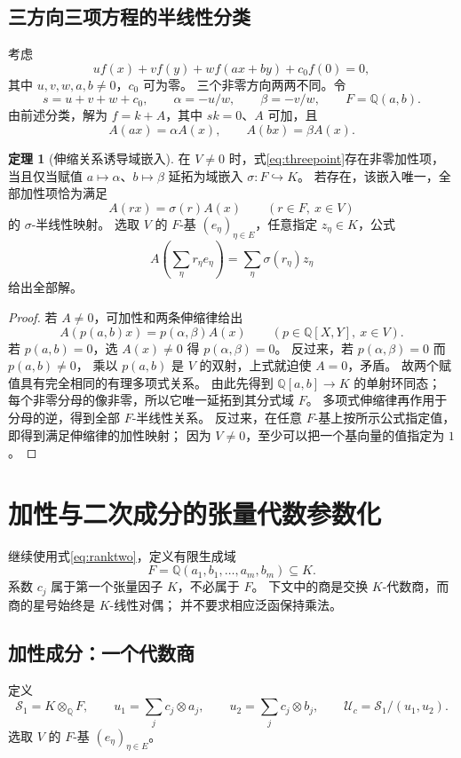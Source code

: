 \documentclass[UTF8,11pt,a4paper]{ctexart}
\theoremstyle{definition}
\newtheorem{theorem}{定理}[section]
\newcommand{\Q}{\mathbb Q}
\newcommand{\Uc}{\mathscr U_c}
\numberwithin{equation}{section}
\begin{document}
\subsection{三方向三项方程的半线性分类}
考虑
\begin{equation}\label{eq:threepoint}
 u f(x)+v f(y)+w f(ax+by)+c_0f(0)=0,
\end{equation}
其中 $u,v,w,a,b\ne0$，$c_0$ 可为零。
三个非零方向两两不同。令
\[
 s=u+v+w+c_0,\qquad
 \alpha=-u/w,\qquad \beta=-v/w,\qquad F=\Q(a,b).
\]
由前述分类，解为 $f=k+A$，其中 $sk=0$、$A$ 可加，且
\[
 A(ax)=\alpha A(x),\qquad A(bx)=\beta A(x).
\]

\begin{theorem}[伸缩关系诱导域嵌入]\label{thm:semilinear}
在 $V\ne0$ 时，式\eqref{eq:threepoint}存在非零加性项，当且仅当赋值
$a\mapsto\alpha$、$b\mapsto\beta$ 延拓为域嵌入
$\sigma:F\hookrightarrow K$。
若存在，该嵌入唯一，全部加性项恰为满足
\[
 A(rx)=\sigma(r)A(x)\qquad(r\in F,\ x\in V)
\]
的 $\sigma$-半线性映射。
选取 $V$ 的 $F$-基 $(e_\eta)_{\eta\in E}$，任意指定 $z_\eta\in K$，公式
\[
 A\!\left(\sum_\eta r_\eta e_\eta\right)
 =\sum_\eta\sigma(r_\eta)z_\eta
\]
给出全部解。
\end{theorem}
\begin{proof}
若 $A\ne0$，可加性和两条伸缩律给出
\[
 A(p(a,b)x)=p(\alpha,\beta)A(x)
 \qquad(p\in\Q[X,Y],\ x\in V).
\]
若 $p(a,b)=0$，选 $A(x)\ne0$ 得 $p(\alpha,\beta)=0$。
反过来，若 $p(\alpha,\beta)=0$ 而 $p(a,b)\ne0$，
乘以 $p(a,b)$ 是 $V$ 的双射，上式就迫使 $A=0$，矛盾。
故两个赋值具有完全相同的有理多项式关系。
由此先得到 $\Q[a,b]\to K$ 的单射环同态；
每个非零分母的像非零，所以它唯一延拓到其分式域 $F$。
多项式伸缩律再作用于分母的逆，得到全部 $F$-半线性关系。
反过来，在任意 $F$-基上按所示公式指定值，即得到满足伸缩律的加性映射；
因为 $V\ne0$，至少可以把一个基向量的值指定为 $1$。
\end{proof}


\section{加性与二次成分的张量代数参数化}\label{sec:tensor}
继续使用式\eqref{eq:ranktwo}，定义有限生成域
\[
 F=\Q(a_1,b_1,\ldots,a_m,b_m)\subseteq K.
\]
系数 $c_j$ 属于第一个张量因子 $K$，不必属于 $F$。
下文中的商是交换 $K$-代数商，而商的星号始终是 $K$-线性对偶；
并不要求相应泛函保持乘法。

\subsection{加性成分：一个代数商}
定义
\[
 \mathscr S_1=K\otimes_{\Q}F,\qquad
 u_1=\sum_jc_j\otimes a_j,\qquad
 u_2=\sum_jc_j\otimes b_j,\qquad
 \Uc=\mathscr S_1/(u_1,u_2).
\]
选取 $V$ 的 $F$-基 $(e_\eta)_{\eta\in E}$。
\end{document}
